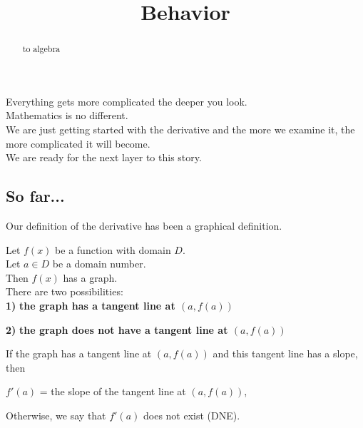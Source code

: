 \documentclass{ximera}
\title{Behavior}
\begin{document}
\begin{abstract}
to algebra
\end{abstract}
\maketitle



Everything gets more complicated the deeper you look. \\


Mathematics is no different. \\


We are just getting started with the derivative and the more we examine it, the more complicated it will become. \\

We are ready for the next layer to this story. \\




\subsection*{So far...}


Our definition of the derivative has been a graphical definition.

\begin{idea}

Let $f(x)$ be a function with domain $D$. \\
Let $a \in D$ be a domain number. \\

Then $f(x)$ has a graph. \\

There are two possibilities:  \\


\textbf{\textcolor{blue!55!black}{1)}} \textbf{the graph has a tangent line at $(a, f(a))$}

\textbf{\textcolor{blue!55!black}{2)}} \textbf{the graph does not have a tangent line at $(a, f(a))$}




If the graph has a tangent line at $(a, f(a))$ and this tangent line has a slope, then


\begin{center}

$f'(a)$ = the slope of the tangent line at $(a, f(a))$,

\end{center}



Otherwise, we say that $f'(a)$ does not exist (DNE).






\end{idea}
\end{document}
